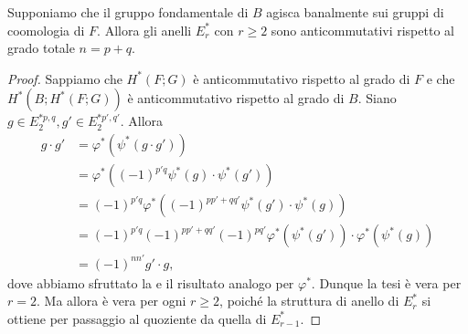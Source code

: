 \begin{corollary}
Supponiamo che il gruppo fondamentale di $B$ agisca banalmente sui gruppi di coomologia di $F$. Allora gli anelli $E^\ast_r$ con $r\ge 2$ sono anticommutativi rispetto al grado totale $n=p+q$.
\end{corollary}
\begin{proof}
Sappiamo che $H^*(F;G)$ è anticommutativo rispetto al grado di $F$ e che $H^*(B;H^*(F;G))$ è anticommutativo rispetto al grado di $B$. Siano $g\in E^{\ast p,q}_2,g'\in E^{\ast p',q'}_2$. Allora
\begin{align*}
g\cdot g'&=\varphi^*(\psi^*(g\cdot g'))\\
&=\varphi^*((-1)^{p'q}\psi^*(g)\cdot\psi^*(g'))\\
&=(-1)^{p'q}\varphi^*((-1)^{pp'+qq'}\psi^*(g')\cdot\psi^*(g))\\
&=(-1)^{p'q}(-1)^{pp'+qq'}(-1)^{pq'}\varphi^*(\psi^*(g'))\cdot\varphi^*(\psi^*(g))\\
&=(-1)^{nn'}g'\cdot g,
\end{align*}
dove abbiamo sfruttato la  e il risultato analogo per $\varphi^*$. Dunque la tesi è vera per $r=2$. Ma allora è vera per ogni $r\ge 2$, poiché la struttura di anello di $E^\ast_r$ si ottiene per passaggio al quoziente da quella di $E^\ast_{r-1}$.
\end{proof}

